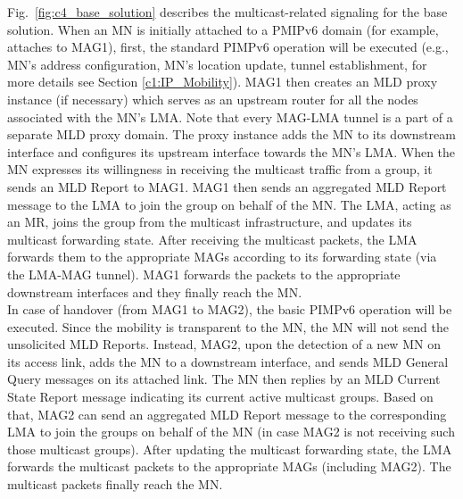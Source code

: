 Fig.~\ref{fig:c4_base_solution} describes the multicast-related signaling for the base solution. When an MN is initially attached to a PMIPv6 domain (for example, attaches to MAG1), first, the standard PIMPv6 operation will be executed (e.g., MN's address configuration, MN's location update, tunnel establishment, for more details see Section \ref{c1:IP_Mobility}). MAG1 then creates an MLD proxy instance (if necessary) which serves as an upstream router for all the nodes associated with the MN's LMA. Note that every MAG-LMA tunnel is a part of a separate MLD proxy domain. The proxy instance adds the MN to its downstream interface and configures its upstream interface towards the MN's LMA. When the MN expresses its willingness in receiving the multicast traffic from a group, it sends an MLD Report to MAG1. MAG1 then sends an aggregated MLD Report message to the LMA to join the group on behalf of the MN. The LMA, acting as an MR, joins the group from the multicast infrastructure, and updates its multicast forwarding state. After receiving the multicast packets, the LMA forwards them to the appropriate MAGs according to its forwarding state (via the LMA-MAG tunnel). MAG1 forwards the packets to the appropriate downstream interfaces and they finally reach the MN. \\

In case of handover (from MAG1 to MAG2), the basic PIMPv6 operation will be executed. Since the mobility is transparent to the MN, the MN will not send the unsolicited MLD Reports. Instead, MAG2, upon the detection of a new MN on its access link, adds the MN to a downstream interface, and sends MLD General Query messages on its attached link. The MN then replies by an MLD Current State Report message indicating its current active multicast groups. Based on that, MAG2 can send an aggregated MLD Report message to the corresponding LMA to join the groups on behalf of the MN (in case MAG2 is not receiving such those multicast groups). After updating the multicast forwarding state, the LMA forwards the multicast packets to the appropriate MAGs (including MAG2). The multicast packets finally reach the MN. 

